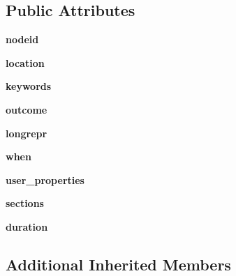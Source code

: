 \subsection*{Public Attributes}
\begin{DoxyCompactItemize}
\item 
\mbox{\label{class__pytest_1_1reports_1_1_test_report_aaae3d9580b769192319bded2cd56a8cf}} 
{\bfseries nodeid}
\item 
\mbox{\label{class__pytest_1_1reports_1_1_test_report_a507c96fff744656139b048b200b09d6b}} 
{\bfseries location}
\item 
\mbox{\label{class__pytest_1_1reports_1_1_test_report_ad6bc68a2e1a1dcf860b4245b8a7fb8c6}} 
{\bfseries keywords}
\item 
\mbox{\label{class__pytest_1_1reports_1_1_test_report_a234b3fb898d7fb3c36d4c44075acd28c}} 
{\bfseries outcome}
\item 
\mbox{\label{class__pytest_1_1reports_1_1_test_report_a0de7d460af06bccf5ed19b51746ceec3}} 
{\bfseries longrepr}
\item 
\mbox{\label{class__pytest_1_1reports_1_1_test_report_a03dfde0c7054aa714ef21f9792d548fc}} 
{\bfseries when}
\item 
\mbox{\label{class__pytest_1_1reports_1_1_test_report_aa73569c4ad9ee40b99d1b72fc62f22a8}} 
{\bfseries user\+\_\+properties}
\item 
\mbox{\label{class__pytest_1_1reports_1_1_test_report_a10aafa93dc9fecbeaf5998c0254d8332}} 
{\bfseries sections}
\item 
\mbox{\label{class__pytest_1_1reports_1_1_test_report_a24bbedb51ed9eff4a57c764a2b840725}} 
{\bfseries duration}
\end{DoxyCompactItemize}
\subsection*{Additional Inherited Members}


